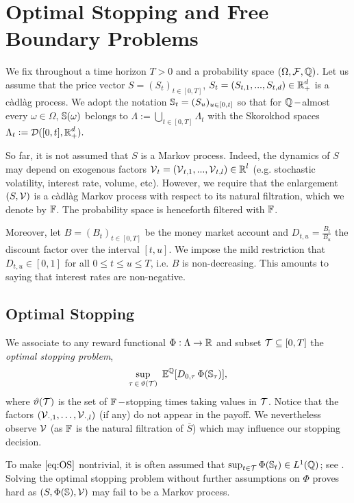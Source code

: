 \section{Optimal Stopping and Free Boundary Problems}


We fix throughout a time horizon $T>0$ and a probability space $(\Omega, \operatorname{\mathcal{F}}, \operatorname{\mathbb{Q}})$.  
Let us assume that the price vector $S = (S_t)_{t\in [0,T]}$, $S_t = (S_{t,1},...,S_{t,d}) \in \operatorname{\mathbb{R}}_{+}^d$  is a c\`adl\`ag  process. 
We adopt the notation $\operatorname{\mathbb{S}}_t = (S_u)_{u\in [0,t]}$ so that for 
$\operatorname{\mathbb{Q}}-$almost every $\omega \in \Omega$,  $\operatorname{\mathbb{S}}(\omega)$ belongs to $ \Lambda := \bigcup_{t\in [0,T]} \Lambda_t$ with the  Skorokhod spaces $\Lambda_t := \operatorname{\mathcal{D}}([0,t],\operatorname{\mathbb{R}}^d_+).$ 

So far, it is not assumed that $S$ is a Markov process. Indeed, the dynamics of $S$ may depend on exogenous factors $\operatorname{\mathcal{V}}_t = (\operatorname{\mathcal{V}}_{t,1},...,\operatorname{\mathcal{V}}_{t,l}) \in \operatorname{\mathbb{R}}^l$ (e.g. stochastic volatility, interest rate, volume, etc). However, we require that the enlargement $(S,\operatorname{\mathcal{V}})$ is a c\`adl\`ag Markov  process with respect to its natural filtration, which we denote by $\operatorname{\mathbb{F}}$. The probability space is henceforth filtered with $\operatorname{\mathbb{F}}$. 

 
Moreover, let  $B=(B_t)_{t\in [0,T]}$ be the money market account and $D_{t,u} = \frac{B_t}{B_u}$ the 
discount factor over the interval $ [t,u]$. We  impose the mild restriction that $D_{t,u} \in [0,1]$ for all $0\le t \le u \le T$, i.e. $B$ is non-decreasing. This amounts to saying that interest rates are non-negative. 

\subsection{Optimal Stopping}
We  associate to any reward functional $\Phi: \Lambda \to \operatorname{\mathbb{R}}$ and subset $\operatorname{\mathcal{T}} \subseteq [0,T]$ the \textit{optimal stopping problem}, 
\begin{equation}\label{eq:OS}
\underset{\tau \, \in \, \vartheta(\calT)}{\text{sup}} \ \E^{\Q}[D_{0,\tau}\, \Phi(\SSS_{\tau})],
\end{equation} 
where $\vartheta(\operatorname{\mathcal{T}})$ is the set of $\operatorname{\mathbb{F}}-$stopping times taking values in $\operatorname{\mathcal{T}}$. Notice that the factors $ (\operatorname{\mathcal{V}}_{\cdot,1},\ldots, \operatorname{\mathcal{V}}_{\cdot,l})$ (if any) do not appear in the payoff. We nevertheless observe $\operatorname{\mathcal{V}}$ (as $\operatorname{\mathbb{F}}$ is the natural filtration of $\bar{S}$) which may influence our stopping decision. 

To make $\eqref{eq:OS}$ nontrivial,
it is often assumed that $\sup_{t \in \operatorname{\mathcal{T}}} \Phi(\operatorname{\mathbb{S}}_{t}) \in L^1(\operatorname{\mathbb{Q}})$; see \cite{PeskirShiryaev}. Solving the optimal stopping problem without further assumptions on $\Phi$ proves hard as 
$(S,\Phi(\operatorname{\mathbb{S}}),\operatorname{\mathcal{V}})$ may fail to be a Markov process. 

